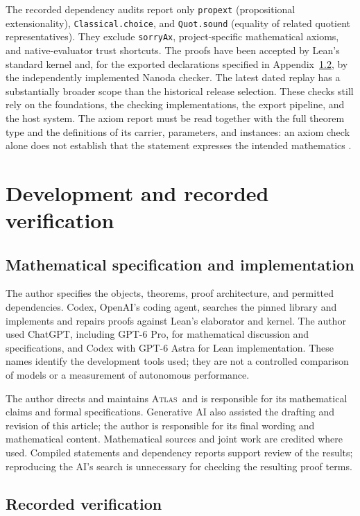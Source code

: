 \documentclass[11pt]{article}
\numberwithin{equation}{section}
\theoremstyle{definition}
\newcommand{\atlas}{\textsc{Atlas}}
\newcommand{\code}[1]{\texttt{\small #1}}
\begin{document}
The recorded dependency audits report only \code{propext}
(propositional extensionality), \code{Classical.choice}, and
\code{Quot.sound} (equality of related quotient representatives).
They exclude \code{sorryAx}, project-specific mathematical axioms, and
native-evaluator trust shortcuts. The proofs have been accepted by
Lean's standard kernel and, for the exported declarations specified in
Appendix~\ref{sec:verification}, by the independently implemented Nanoda
checker. The latest dated replay has a substantially broader scope than
the historical release selection. These checks still
rely on the foundations, the checking implementations, the export
pipeline, and the host system. The axiom report must be read together
with the full theorem type and the definitions of its carrier,
parameters, and instances: an axiom check alone does not establish
that the statement expresses the intended mathematics
\cite{LeanValidation,Soundness}.

\section{Development and recorded verification}\label{sec:workflow}

\subsection{Mathematical specification and implementation}

The author specifies the objects, theorems, proof architecture, and
permitted dependencies. Codex, OpenAI's coding agent, searches the
pinned library and implements and repairs proofs against Lean's
elaborator and kernel. The author used ChatGPT, including
GPT-6 Pro, for mathematical discussion and specifications, and Codex
with GPT-6 Astra for Lean implementation. These names identify the
development tools used; they are not a controlled comparison of
models or a measurement of autonomous performance.

The author directs and maintains \atlas\ and is responsible for its
mathematical claims and formal specifications. Generative AI also
assisted the drafting and revision of this article; the author is
responsible for its final wording and mathematical content. Mathematical sources
and joint work are credited where used. Compiled statements and
dependency reports support review of the results; reproducing the
AI's search is unnecessary for checking the resulting proof terms.

\subsection{Recorded verification}\label{sec:verification}
\end{document}
